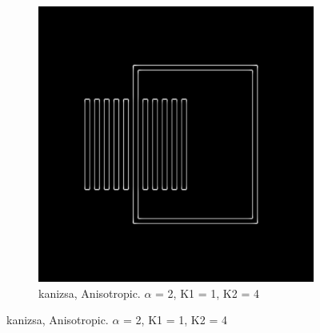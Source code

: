 \begin{figure}[H]
\centering 
  \begin{subfigure}{.7\textwidth}
    \centering
    \includegraphics[width=.9\textwidth]{./canny/kanizsa_ANISO_a2_k11_k24}
    \caption{kanizsa, Anisotropic. $\alpha$ = 2, K1 = 1, K2 = 4}
    \label{fig:kanizsa_ANISO_a2_k11_k24}
  \end{subfigure}%
  
\end{figure}